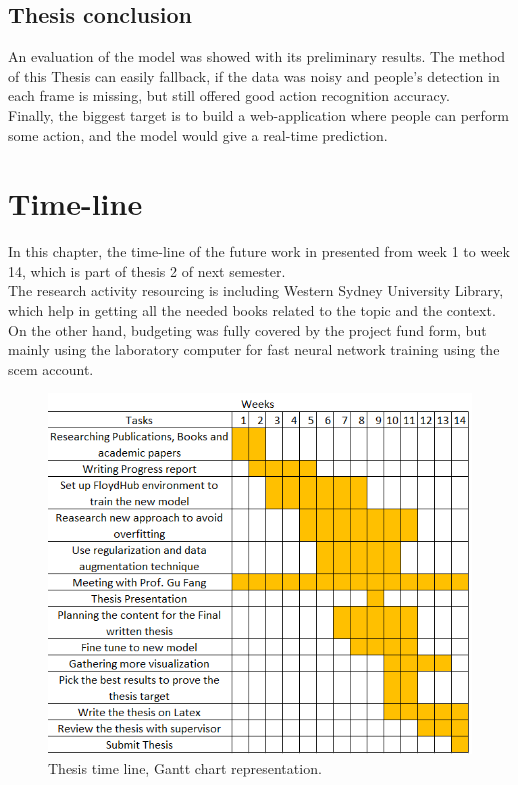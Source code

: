 \section{Thesis conclusion}
\hspace{5mm} An evaluation of the model was showed with its preliminary results. The method of this Thesis can easily fallback, if the data was noisy and people's detection in each frame is missing, but still offered good action recognition accuracy.\\
Finally, the biggest target is to build a web-application where people can perform some action, and the model would give a real-time prediction.\\
\chapter{Time-line}
\hspace{5mm} In this chapter, the time-line of the future work in presented from week 1 to week 14, which is part of thesis 2 of next semester.\\

The research activity resourcing is including Western Sydney University Library, which help in getting all the needed books related to the topic and the context. On the other hand, budgeting was fully covered by the project fund form, but mainly using the laboratory computer for fast neural network training using the scem account.
\begin{figure}[ht]
    \centering
    \includegraphics{Figures/fc}
    \decoRule
    \caption [Thesis time line, Gantt chart representation.]{Thesis time line, Gantt chart representation.}
    \label{fig:la}
    \end{figure}\hfill \\
